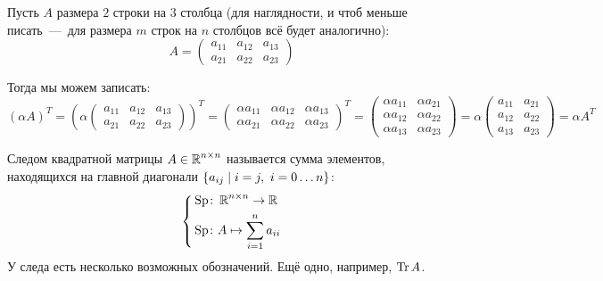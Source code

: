 \documentclass[a4paper,12pt]{article}
\begin{document}
  \begin{solution}
    Пусть $A$ размера $2$ строки на $3$ столбца (для наглядности, и чтоб меньше писать~---~для размера $m$ строк на $n$ столбцов всё будет аналогично):
    \[
      A = \begin{pmatrix}
        a_{11} & a_{12} & a_{13}\\
        a_{21} & a_{22} & a_{23}
      \end{pmatrix}
    \]
    
    Тогда мы можем записать:
    \begin{equation*}
      (\alpha A)^T
      = \left(
          \alpha \begin{pmatrix}
            a_{11} & a_{12} & a_{13}\\
            a_{21} & a_{22} & a_{23}
          \end{pmatrix}
        \right)^T
      = \begin{pmatrix}
          \alpha a_{11} & \alpha a_{12} & \alpha a_{13}\\
          \alpha a_{21} & \alpha a_{22} & \alpha a_{23}
        \end{pmatrix}^T
      = \begin{pmatrix}
          \alpha a_{11} & \alpha a_{21}\\
          \alpha a_{12} & \alpha a_{22}\\
          \alpha a_{13} & \alpha a_{23}
        \end{pmatrix}
      = \alpha \begin{pmatrix}
          a_{11} & a_{21}\\
          a_{12} & a_{22}\\
          a_{13} & a_{23}
         \end{pmatrix}
      = \alpha A^T
    \end{equation*}
  \end{solution}
  
  \begin{definition}
    Следом квадратной матрицы $A \in \operatorname{\mathbb R}^{n \times n}$ называется сумма элементов, находящихся на главной диагонали $\{a_{ij} \hm\mid i = j,\ i = 0 \ldots n\}$:
    \[
      \left\{
        \begin{aligned}
          &\operatorname{Sp} \colon \operatorname{\mathbb R}^{n \times n} \to \operatorname{\mathbb R}\\
          &\operatorname{Sp} \colon A \mapsto \sum_{i = 1}^n a_{ii}
        \end{aligned}
      \right.
    \]
    У следа есть несколько возможных обозначений.
    Ещё одно, например, $\operatorname{Tr} A$.
  \end{definition}
\end{document}

